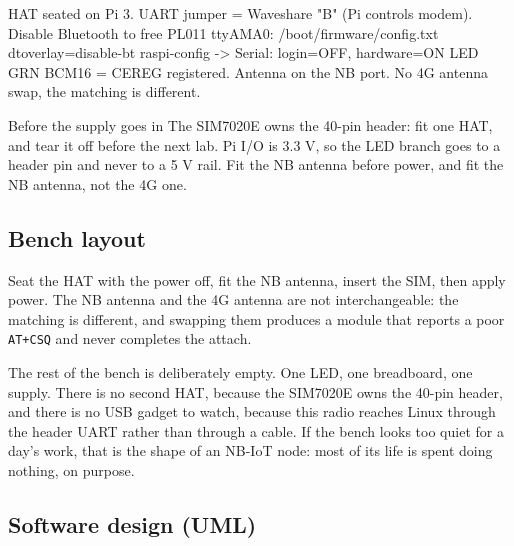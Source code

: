 \begin{asciiart}
HAT seated on Pi 3. UART jumper = Waveshare "B" (Pi controls modem).
Disable Bluetooth to free PL011 ttyAMA0:
  /boot/firmware/config.txt   dtoverlay=disable-bt
  raspi-config -> Serial: login=OFF, hardware=ON
LED GRN BCM16 = CEREG registered.
Antenna on the NB port. No 4G antenna swap, the matching is different.
\end{asciiart}

\begin{rulebox}{Before the supply goes in}
The SIM7020E owns the 40-pin header: fit one HAT, and tear it off before the next lab. Pi I/O is 3.3 V, so the LED branch goes to a header pin and never to a 5 V rail. Fit the NB antenna before power, and fit the NB antenna, not the 4G one.
\end{rulebox}

\subsection*{Bench layout}


Seat the HAT with the power off, fit the NB antenna, insert the SIM, then apply power. The NB antenna and the 4G antenna are not interchangeable: the matching is different, and swapping them produces a module that reports a poor \texttt{AT+CSQ} and never completes the attach.

The rest of the bench is deliberately empty. One LED, one breadboard, one supply. There is no second HAT, because the SIM7020E owns the 40-pin header, and there is no USB gadget to watch, because this radio reaches Linux through the header UART rather than through a cable. If the bench looks too quiet for a day's work, that is the shape of an NB-IoT node: most of its life is spent doing nothing, on purpose.

\subsection*{Software design (UML)}


